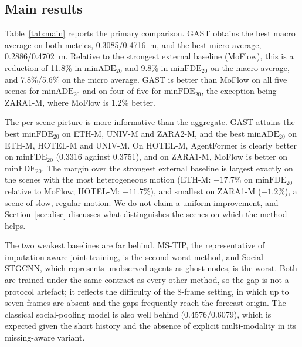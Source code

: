 \subsection{Main results}
\label{sec:main}

Table~\ref{tab:main} reports the primary comparison. GAST obtains the best macro average on both metrics, 0.3085/0.4716~m, and the best micro average, 0.2886/0.4702~m. Relative to the strongest external baseline (MoFlow), this is a reduction of 11.8\% in $\mathrm{minADE}_{20}$ and 9.8\% in $\mathrm{minFDE}_{20}$ on the macro average, and 7.8\%/5.6\% on the micro average. GAST is better than MoFlow on all five scenes for $\mathrm{minADE}_{20}$ and on four of five for $\mathrm{minFDE}_{20}$, the exception being ZARA1-M, where MoFlow is 1.2\% better.

The per-scene picture is more informative than the aggregate. GAST attains the best $\mathrm{minFDE}_{20}$ on ETH-M, UNIV-M and ZARA2-M, and the best $\mathrm{minADE}_{20}$ on ETH-M, HOTEL-M and UNIV-M. On HOTEL-M, AgentFormer is clearly better on $\mathrm{minFDE}_{20}$ (0.3316 against 0.3751), and on ZARA1-M, MoFlow is better on $\mathrm{minFDE}_{20}$. The margin over the strongest external baseline is largest exactly on the scenes with the most heterogeneous motion (ETH-M: $-17.7\%$ on $\mathrm{minFDE}_{20}$ relative to MoFlow; HOTEL-M: $-11.7\%$), and smallest on ZARA1-M ($+1.2\%$), a scene of slow, regular motion. We do not claim a uniform improvement, and Section~\ref{sec:disc} discusses what distinguishes the scenes on which the method helps.

The two weakest baselines are far behind. MS-TIP, the representative of imputation-aware joint training, is the second worst method, and Social-STGCNN, which represents unobserved agents as ghost nodes, is the worst. Both are trained under the same contract as every other method, so the gap is not a protocol artefact; it reflects the difficulty of the 8-frame setting, in which up to seven frames are absent and the gaps frequently reach the forecast origin. The classical social-pooling model is also well behind (0.4576/0.6079), which is expected given the short history and the absence of explicit multi-modality in its missing-aware variant.

